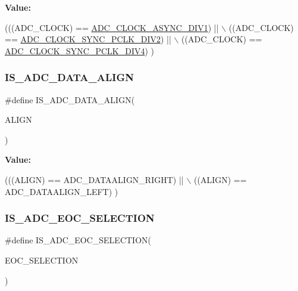 {\bfseries Value\+:}
\begin{DoxyCode}
(((ADC\_CLOCK) == \hyperlink{group___a_d_c___clock_prescaler_ga092c0277fd6db9b905d229c9f8dda8ab}{ADC\_CLOCK\_ASYNC\_DIV1})     || \(\backslash\)
                                          ((ADC\_CLOCK) == 
      \hyperlink{group___a_d_c___clock_prescaler_ga71571b183aa6d0ddbaeef8a1da11d00a}{ADC\_CLOCK\_SYNC\_PCLK\_DIV2}) || \(\backslash\)
                                          ((ADC\_CLOCK) == 
      \hyperlink{group___a_d_c___clock_prescaler_ga41b6a6d1cdf7806ec1e5790fc7fdc651}{ADC\_CLOCK\_SYNC\_PCLK\_DIV4})   )
\end{DoxyCode}
\mbox{\label{group___a_d_c___private___macros_ga2903b620e3c61dc47ed8c0fbf4197801}} 
\subsubsection{\texorpdfstring{I\+S\+\_\+\+A\+D\+C\+\_\+\+D\+A\+T\+A\+\_\+\+A\+L\+I\+GN}{IS\_ADC\_DATA\_ALIGN}}
{\footnotesize\ttfamily \#define I\+S\+\_\+\+A\+D\+C\+\_\+\+D\+A\+T\+A\+\_\+\+A\+L\+I\+GN(\begin{DoxyParamCaption}\item[{}]{A\+L\+I\+GN }\end{DoxyParamCaption})}

{\bfseries Value\+:}
\begin{DoxyCode}
(((ALIGN) == ADC\_DATAALIGN\_RIGHT) || \(\backslash\)
                                  ((ALIGN) == ADC\_DATAALIGN\_LEFT)    )
\end{DoxyCode}
\mbox{\label{group___a_d_c___private___macros_ga9e0a777b64cb66657c862021cd05ae64}} 
\subsubsection{\texorpdfstring{I\+S\+\_\+\+A\+D\+C\+\_\+\+E\+O\+C\+\_\+\+S\+E\+L\+E\+C\+T\+I\+ON}{IS\_ADC\_EOC\_SELECTION}}
{\footnotesize\ttfamily \#define I\+S\+\_\+\+A\+D\+C\+\_\+\+E\+O\+C\+\_\+\+S\+E\+L\+E\+C\+T\+I\+ON(\begin{DoxyParamCaption}\item[{}]{E\+O\+C\+\_\+\+S\+E\+L\+E\+C\+T\+I\+ON }\end{DoxyParamCaption})}

